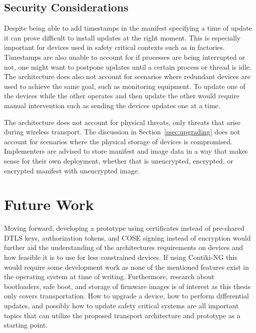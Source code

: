 \documentclass[0-thesis.tex]{subfiles}
\begin{document}
\subsection{Security Considerations}
\label{ssec:security-considerations}
Despite being able to add timestamps in the manifest specifying a time of update it can
prove difficult to install updates at the right moment. This is especially important for
devices used in safety critical contexts such as in factories. Timestamps are also unable
to account for if processes are being interrupted or not, one might want to postpone
updates until a certain process or thread is idle. The architecture does also not account
for scenarios where redundant devices are used to achieve the same goal, such as
monitoring equipment. To update one of the devices while the other operates and then
update the other would require manual intervention such as sending the devices updates one
at a time.

The architecture does not account for physical threats, only threats that arise during
wireless transport. The discussion in Section~\ref{ssec:upgrading} does not account for
scenarios where the physical storage of devices is compromised. Implementers are advised
to store manifest and image data in a way that makes sense for their own deployment,
whether that is unencrypted, encrypted, or encrypted manifest with unencrypted image.


\section{Future Work}
\label{sec:future-work}
Moving forward, developing a prototype using certificates instead of pre-shared DTLS keys,
authorization tokens, and COSE signing instead of encryption would further aid the
understanding of the architectures requirements on devices and how feasible it is to use
for less constrained devices. If using Contiki-NG this would require some development work
as none of the mentioned features exist in the operating system at time of writing.
Furthermore, research about bootloaders, safe boot, and storage of firmware images is of
interest as this thesis only covers transportation. How to upgrade a device, how to
perform differential updates, and possibly how to update safety critical systems are all
important topics that can utilize the proposed transport architecture and prototype as a
starting point.
\end{document}
